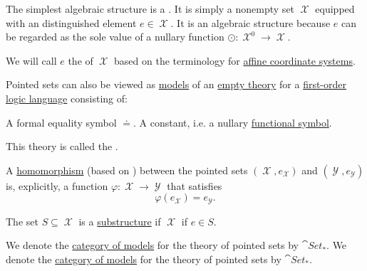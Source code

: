 \begin{definition}\label{def:pointed_set}
  The simplest algebraic structure is a . It is simply a nonempty set \( \mscrX \) equipped with an distinguished element \( e \in \mscrX \). It is an algebraic structure because \( e \) can be regarded as the sole value of a nullary function \( \odot: \mscrX^0 \to \mscrX \).

  We will call \( e \) the  of \( \mscrX \) based on the terminology for \hyperref[def:euclidean_plane_coordinate_system/origin]{affine coordinate systems}.

  \begin{thmenum}
     Pointed sets can also be viewed as \hyperref[def:first_order_semantics/satisfiability]{models} of an \hyperref[def:first_order_semantics/theory]{empty theory} for a \hyperref[def:first_order_language]{first-order logic language} consisting of:
    \begin{thmenum}
       A formal equality symbol \( \doteq \).
       A constant, i.e. a nullary \hyperref[def:first_order_language/func]{functional symbol}.
    \end{thmenum}

    This theory is called the .

     A \hyperref[def:first_order_homomorphism]{homomorphism} (based on ) between the pointed sets \( (\mscrX, e_{\mscrX}) \) and \( (\mscrY, e_{\mscrY}) \) is, explicitly, a function \( \varphi: \mscrX \to \mscrY \) that satisfies
    \begin{equation}\label{eq:def:pointed_set/homomorphism}
      \varphi(e_{\mscrX}) = e_{\mscrY}.
    \end{equation}

     The set \( S \subseteq \mscrX \) is a \hyperref[def:first_order_substructure]{substructure} if \( \mscrX \) if \( e \in S \).

     We denote the \hyperref[def:category_of_first_order_models]{category of models} for the theory of pointed sets by \( \cat{Set}_* \). We denote the \hyperref[def:category_of_first_order_models]{category of models} for the theory of pointed sets by \( \cat{Set}_* \).
  \end{thmenum}
\end{definition}
